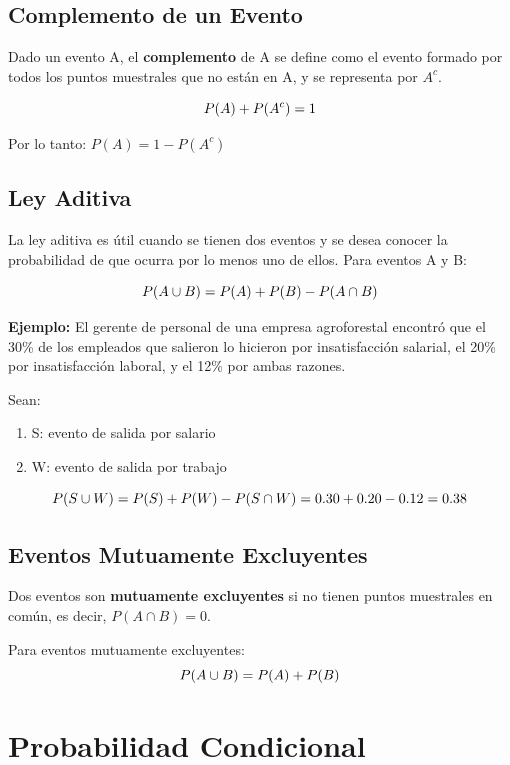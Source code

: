 \documentclass[
  spanish,
  letterpaper,
]{book}
\begin{document}
\subsection{Complemento de un Evento}\label{complemento-de-un-evento}

Dado un evento A, el \textbf{complemento} de A se define como el evento
formado por todos los puntos muestrales que no están en A, y se
representa por \(A^c\).

\[\LARGE P(A) + P(A^c) = 1\]

Por lo tanto: \(P(A) = 1 - P(A^c)\)

\subsection{Ley Aditiva}\label{ley-aditiva}

La ley aditiva es útil cuando se tienen dos eventos y se desea conocer
la probabilidad de que ocurra por lo menos uno de ellos. Para eventos A
y B:

\[\Large P(A \cup B) = P(A) + P(B) - P(A \cap B)\]

\textbf{Ejemplo:} El gerente de personal de una empresa agroforestal
encontró que el 30\% de los empleados que salieron lo hicieron por
insatisfacción salarial, el 20\% por insatisfacción laboral, y el 12\%
por ambas razones.

Sean:

\begin{enumerate}
\def\labelenumi{\arabic{enumi}.}
\item
  S: evento de salida por salario
\item
  W: evento de salida por trabajo
\end{enumerate}

\[\large P(S \cup W) = P(S) + P(W) - P(S \cap W) = 0.30 + 0.20 - 0.12 = 0.38\]

\subsection{Eventos Mutuamente
Excluyentes}\label{eventos-mutuamente-excluyentes}

Dos eventos son \textbf{mutuamente excluyentes} si no tienen puntos
muestrales en común, es decir, \(P(A \cap B) = 0\).

Para eventos mutuamente excluyentes:\\
\[\LARGE P(A \cup B) = P(A) + P(B)\]

\section{Probabilidad Condicional}\label{probabilidad-condicional}
\end{document}
